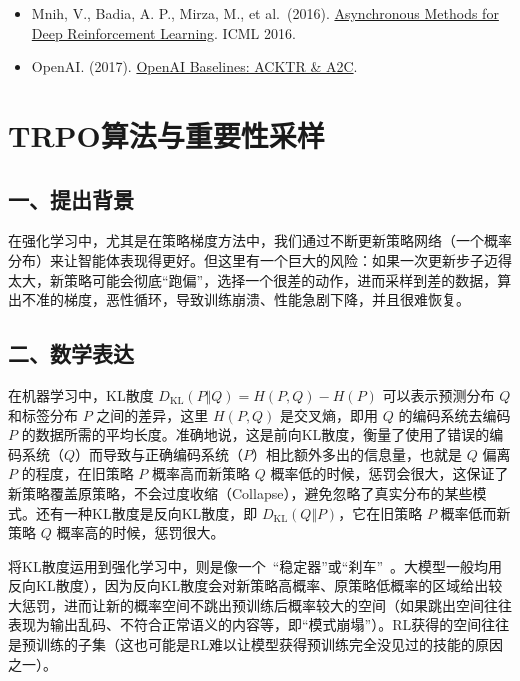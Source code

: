 \begin{itemize}
\tightlist
\item
  Mnih, V., Badia, A. P., Mirza, M., et al.~(2016). \href{https://arxiv.org/abs/1602.01783}{Asynchronous Methods for Deep Reinforcement Learning}. ICML 2016.
\item
  OpenAI. (2017). \href{https://openai.com/index/openai-baselines-acktr-a2c/}{OpenAI Baselines: ACKTR \& A2C}.
\end{itemize}

\clearpage

\hypertarget{trpoux7b97ux6cd5ux4e0eux91cdux8981ux6027ux91c7ux6837}{%
\section{TRPO算法与重要性采样}\label{trpoux7b97ux6cd5ux4e0eux91cdux8981ux6027ux91c7ux6837}}

\hypertarget{ux4e00ux63d0ux51faux80ccux666f}{%
\subsection{一、提出背景}\label{ux4e00ux63d0ux51faux80ccux666f}}

在强化学习中，尤其是在策略梯度方法中，我们通过不断更新策略网络（一个概率分布）来让智能体表现得更好。但这里有一个巨大的风险：如果一次更新步子迈得太大，新策略可能会彻底``跑偏''，选择一个很差的动作，进而采样到差的数据，算出不准的梯度，恶性循环，导致训练崩溃、性能急剧下降，并且很难恢复。

\hypertarget{ux4e8cux6570ux5b66ux8868ux8fbe-1}{%
\subsection{二、数学表达}\label{ux4e8cux6570ux5b66ux8868ux8fbe-1}}

在机器学习中，KL散度 \(D_{\mathrm{KL}}(P\Vert Q)=H(P,Q)-H(P)\) 可以表示预测分布 \(Q\) 和标签分布 \(P\) 之间的差异，这里 \(H(P,Q)\) 是交叉熵，即用 \(Q\) 的编码系统去编码 \(P\) 的数据所需的平均长度。准确地说，这是前向KL散度，衡量了使用了错误的编码系统（\(Q\)）而导致与正确编码系统（\(P\)）相比额外多出的信息量，也就是 \(Q\) 偏离 \(P\) 的程度，在旧策略 \(P\) 概率高而新策略 \(Q\) 概率低的时候，惩罚会很大，这保证了新策略覆盖原策略，不会过度收缩（Collapse），避免忽略了真实分布的某些模式。还有一种KL散度是反向KL散度，即 \(D_{\mathrm{KL}}(Q\Vert P)\)，它在旧策略 \(P\) 概率低而新策略 \(Q\) 概率高的时候，惩罚很大。

将KL散度运用到强化学习中，则是像一个~``稳定器''或``刹车''~。大模型一般均用反向KL散度），因为反向KL散度会对新策略高概率、原策略低概率的区域给出较大惩罚，进而让新的概率空间不跳出预训练后概率较大的空间（如果跳出空间往往表现为输出乱码、不符合正常语义的内容等，即``模式崩塌''）。RL获得的空间往往是预训练的子集（这也可能是RL难以让模型获得预训练完全没见过的技能的原因之一）。

